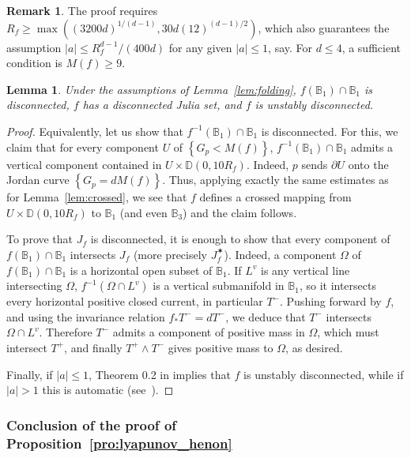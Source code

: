 \documentclass[oneside, 12pt]{amsart}
\newcommand{\disk}{\mathbb{D}}
\newcommand{\fr}{\partial}
\newcommand{\set}[1]{\left\{#1\right\}}
\newcommand{\abs}[1]{\left\vert#1\right\vert}
\newcommand{\inv}{^{-1}}
\newcommand{\bb}{\mathbb{B}}
\theoremstyle{plain}
\newtheorem{lem}[thm]{Lemma}
\theoremstyle{definition}
\newtheorem{rem}[thm]{Remark}
\numberwithin{equation}{section}       %
\numberwithin{equation}{section}       %
\begin{document}
\begin{rem}\label{rem:bound_M}
The proof requires   $R_f\geq \max ((3200d)^{1/(d-1)},  30 d (12)^{(d-1)/2})$, 
which also guarantees the assumption   
$\abs{a}\leq R_f^{d-1}/(400d)$  for any given $\abs{a}\leq 1$, say. 
For $d\leq 4$, a sufficient condition  is  $M(f)\geq 9$.
\end{rem}


\begin{lem}\label{lem:disconnected}
Under the assumptions of Lemma~\ref{lem:folding}, $f(\bb_1)\cap \bb_1$ is disconnected, 
$f$ has a disconnected Julia set, and $f$ is unstably disconnected. 
\end{lem}

\begin{proof}
Equivalently, let us show  that $f\inv(\bb_1)\cap \bb_1$ is disconnected. 
For this, we claim that for every component $U$ of $\set{G_p<M(f)}$, 
$f\inv(\bb_1)\cap \bb_1$ admits a 
vertical component contained in  $U\times \disk(0, 10R_f)$. 
Indeed, $p$ sends $\fr U$ onto the Jordan curve $\set{G_p=dM(f)}$. 
Thus, applying exactly the same estimates as for Lemma~\ref{lem:crossed}, we see that 
$f$ defines a crossed mapping from $U\times \disk(0, 10R_f)$ to $\bb_1$ (and even $\bb_3$)  and 
the claim follows. 

To prove that  $J_f$ is disconnected,  it is enough to show that  
 every component of $f(\bb_1)\cap \bb_1$ intersects $J_f$ (more precisely $J_f^\varstar$). 
Indeed,  a component $\Omega$ of $f(\bb_1)\cap \bb_1$ is a horizontal open subset of $\bb_1$. If
 $L^v$ is  any vertical line intersecting $\Omega$, 
  $f\inv(\Omega\cap L^v)$ is a vertical submanifold in $\bb_1$, so it intersects every horizontal  positive closed current, in particular $T^-$. 
  Pushing forward by $f$, and using the 
 invariance relation $f_*T^- = dT^-$, we deduce that    $T^-$ 
 intersects $\Omega\cap L^v$. Therefore $T^-$
 admits a   component of positive mass in $\Omega$, 
 which must intersect $T^+$, and  finally $T^+\wedge  T^-$ gives positive mass to 
 $\Omega$, as desired. 

Finally, if $\abs{a}\leq 1$, Theorem 0.2 in \cite{bs6} implies that $f$ is unstably disconnected, while 
if   $\abs{a}> 1$ this is automatic (see~\cite[Cor. 7.4]{bs6}).
\end{proof}

 
\subsubsection{Conclusion of the proof of Proposition~\ref{pro:lyapunov_henon}}\label{subsub:conclusion_proof_henon}
\end{document}
